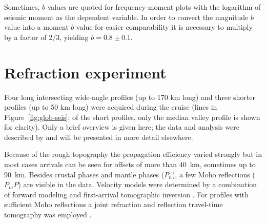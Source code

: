 \documentclass[aguplus]{aguplus}
\begin{document}
\begin{article}
Sometimes, $b$ values are quoted for frequency-moment  plots with
 the logarithm of seismic moment as the dependent variable. In order to convert the magnitude $b$ value into a
 moment $b$ value for easier comparability it  is necessary to multiply by a factor of $2/3$,
yielding $b=0.8\pm0.1$.

\section{Refraction experiment}
\label{sec:refraction}

Four long intersecting wide-angle profiles (up to 170 km long) and three
shorter  profiles (up to 50 km long) were acquired during the cruise
(lines in Figure~\ref{fig:glob-seis}; of the short profiles, only
the median valley profile is shown for clarity).  %
 Only a brief overview  is given here; the data
and analysis were described by \citet{planert-con03} and will be
presented in more detail elsewhere.

Because of the rough topography  the propagation efficiency varied strongly but in most cases
arrivals can be seen for offsets of more than 40~km, sometimes up to 90~km. Besides crustal phases and
mantle phases ($P_n$),  a few Moho reflections ($P_mP$) are visible in
the data.  Velocity models were determined by a combination of
forward modeling and first-arrival tomographic inversion \citep{luetgert88,zelt98}. For
profiles with sufficient Moho reflections a joint refraction and
reflection travel-time tomography was employed \citep{korenaga00}.



\end{article}
\end{document}
